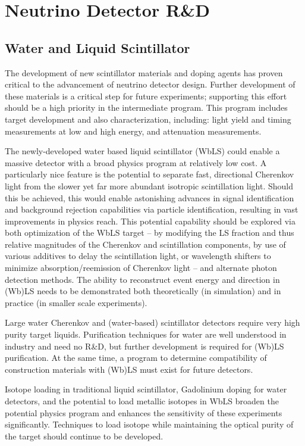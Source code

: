 \section{Neutrino Detector R\&D}
\label{sec:RandD}

\subsection{Water and Liquid Scintillator}

The development of new scintillator materials and doping agents has proven critical to the advancement of neutrino detector design.  Further development of these materials is a critical step for future experiments; supporting this effort should be a high priority in the intermediate program.  This program includes target development and also characterization, including: light yield and timing measurements at low and high energy, and attenuation measurements.

The newly-developed water based liquid scintillator (WbLS) could enable a massive detector with a broad physics program at relatively low cost.  A particularly nice feature is the potential to separate fast, directional Cherenkov light from the slower yet far more abundant isotropic scintillation light.  Should this be achieved, this would enable astonishing advances in signal identification and background rejection capabilities via particle identification, resulting in vast improvements in physics reach.  This potential capability should be explored via both optimization of the WbLS target -- by modifying the LS fraction and thus relative magnitudes of the Cherenkov and scintillation components, by use of various additives to delay the scintillation light, or wavelength shifters to minimize absorption/reemission of Cherenkov light --  and alternate photon detection methods.  The ability to reconstruct event energy and direction in (Wb)LS needs to be demonstrated both theoretically (in simulation) and in practice (in smaller scale experiments). 

Large water Cherenkov and (water-based) scintillator detectors require very high purity target liquids.  Purification techniques for water are well understood in industry and need no R\&D, but further development is required for (Wb)LS purification.  At the same time, a program to determine compatibility of construction materials with (Wb)LS must exist for future detectors.

Isotope loading in traditional liquid scintillator, Gadolinium doping for water detectors, and the potential to load metallic isotopes in WbLS broaden the potential physics program and enhances the sensitivity of these experiments significantly.  Techniques to load isotope while maintaining the optical purity of the target should continue to be developed.  %

